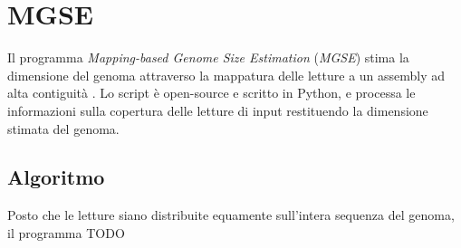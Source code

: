 \documentclass[crop=false, class=book]{standalone}
\begin{document}
	\chapter{MGSE}
	Il programma \textit{Mapping-based Genome Size Estimation} (\textit{MGSE}) stima la dimensione del genoma attraverso la mappatura delle letture a un assembly ad alta contiguità \cite{pucker2019MGSE}. Lo script è open-source e scritto in Python, e processa le informazioni sulla copertura delle letture di input restituendo la dimensione stimata del genoma.
	
	\section{Algoritmo}
	Posto che le letture siano distribuite equamente sull'intera sequenza del genoma, il programma TODO
	
%	
%	
%		
%	
%	
%
	

	

	
	
	
\end{document}
